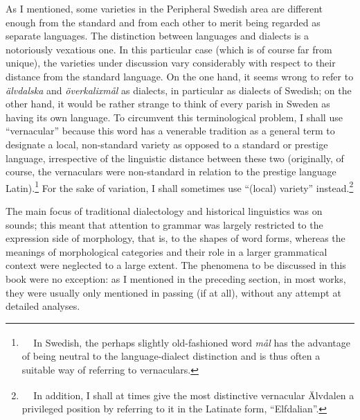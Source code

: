 \begin{styleBodytextC}
As I mentioned, some varieties in the Peripheral Swedish area are different enough from the standard and from each other to merit being regarded as separate languages. The distinction between languages and dialects is a notoriously vexatious one. In this particular case (which is of course far from unique), the varieties under discussion vary considerably with respect to their distance from the standard language. On the one hand, it seems wrong to refer to \textit{älvdalska} and \textit{överkalixmål }as dialects, in particular as dialects of Swedish; on the other hand, it would be rather strange to think of every parish in Sweden as having its own language. To circumvent this terminological problem, I shall use “vernacular” because this word has a venerable tradition as a general term to designate a local, non-standard variety as opposed to a standard or prestige language, irrespective of the linguistic distance between these two (originally, of course, the vernaculars were non-standard in relation to the prestige language Latin).\footnote{\textsuperscript{\ \ } In Swedish, the perhaps slightly old-fashioned word \textit{mål} has the advantage of being neutral to the language-dialect distinction and is thus often a suitable way of referring to vernaculars. } For the sake of variation, I shall sometimes use “(local) variety” instead.\footnote{\textsuperscript{\ \ } In addition, I shall at times give the most distinctive vernacular Älvdalen a privileged position by referring to it in the Latinate form, “Elfdalian”.}

\end{styleBodytextC}


\begin{styleBodyTextFirst}
The main focus of traditional dialectology and historical linguistics was on sounds; this meant that attention to grammar was largely restricted to the expression side of morphology, that is, to the shapes of word forms, whereas the meanings of morphological categories and their role in a larger grammatical context were neglected to a large extent. The phenomena to be discussed in this book were no exception: as I mentioned in the preceding section, in most works, they were usually only mentioned in passing (if at all), without any attempt at detailed analyses.

\end{styleBodyTextFirst}

